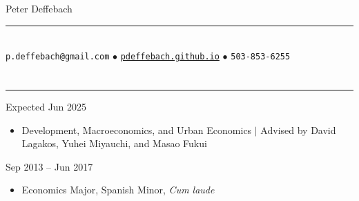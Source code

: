 \documentclass[10.5pt]{article}
\newenvironment{customitemize}
{ \begin{itemize}[leftmargin=\parindent, topsep = 0.2pt, itemsep = -3pt] }
{\end{itemize} }
\begin{document}
\normalsize
\singlespacing
\thispagestyle{empty}

\begin{center}
{\Large \sc Peter Deffebach} \\ 
\vspace{-5pt}
\rule{3in}{1pt} \\
\texttt{p.deffebach@gmail.com} $\bullet$ \href{https://pdeffebach.github.io/}{\texttt{pdeffebach.github.io}} $\bullet$ \texttt{503-853-6255}  \\
\end{center} 

\vspace{-12pt}
\section*{}
\noindent \rule{\textwidth}{1pt} 
  \hfill Expected Jun 2025
\begin{customitemize}
	\item Development, Macroeconomics, and Urban Economics $\big |$ Advised by David Lagakos, Yuhei Miyauchi, and Masao Fukui
\end{customitemize}
  \hfill Sep 2013 -- Jun 2017
\begin{customitemize}
	\item Economics Major, Spanish Minor, \textit{Cum laude}
\end{customitemize}
\end{document}
